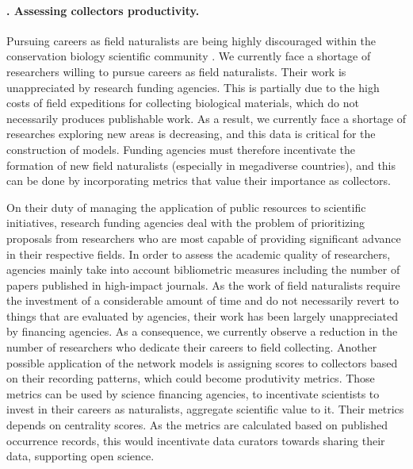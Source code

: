 \paragraph*{\theApplicationCase. Assessing collectors productivity.}
Pursuing careers as field naturalists are being highly discouraged within the conservation biology scientific community \cite{Noss1996}.
We currently face a shortage of researchers willing to pursue careers as field naturalists.
Their work is unappreciated by research funding agencies.
This is partially due to the high costs of field expeditions for collecting biological materials, which do not necessarily produces publishable work.
As a result, we currently face a shortage of researches exploring new areas is decreasing, and this data is critical for the construction of models.
Funding agencies must therefore incentivate the formation of new field naturalists (especially in megadiverse countries), and this can be done by incorporating metrics that value their importance as collectors.

On their duty of managing the application of public resources to scientific initiatives, research funding agencies deal with the problem of prioritizing proposals from researchers who are most capable of providing significant advance in their respective fields.
In order to assess the academic quality of researchers, agencies mainly take into account bibliometric measures including the number of papers published in high-impact journals. 
%
As the work of field naturalists require the investment of a considerable amount of time and do not necessarily revert to things that are evaluated by agencies, their work has been largely unappreciated by financing agencies.
As a consequence, we currently observe a reduction in the number of researchers who dedicate their careers to field collecting.
%
Another possible application of the network models is assigning scores to collectors based on their recording patterns, which could become produtivity metrics.
Those metrics can be used by science financing agencies, to incentivate scientists to invest in their careers as naturalists, aggregate scientific value to it.
Their metrics depends on centrality scores.
As the metrics are calculated based on published occurrence records, this would incentivate data curators towards sharing their data, supporting open science.


